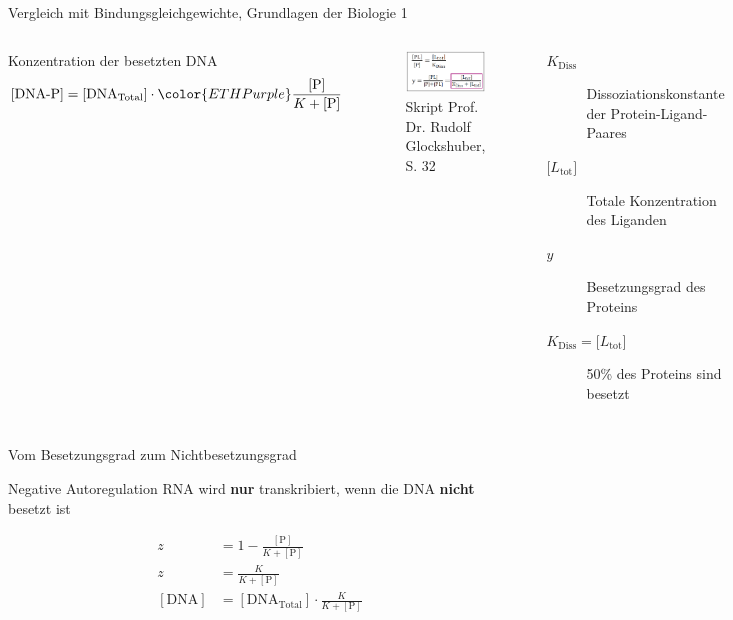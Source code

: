 \documentclass[11pt,aspectratio=169,reqno]{beamer}
\begin{document}
\begin{frame}{Vergleich mit Bindungsgleichgewichte, Grundlagen der Biologie 1}
    \begin{columns}
        Konzentration der besetzten DNA\vspace{1em}
        \[[\text{DNA-P}]=[\text{DNA$_\text{Total}$}]\cdot\color{ETHPurple}\frac{[\text{P}]}{K+[\text{P}]}\]
        \pause
        
        \begin{figure}
            \centering
            \includegraphics[width=.6\textwidth]{images/occuption_degree_glockshuber.png}
            \caption*{\tiny Skript Prof. Dr. Rudolf Glockshuber, S. 32}
        \end{figure}
        
        \begin{description}
            \item[$K_\text{Diss}$] Dissoziationskonstante der Protein-Ligand-Paares
            \item[$\lbrack L_\text{tot}\rbrack$] Totale Konzentration des Liganden
            \item[$y$] Besetzungsgrad des Proteins
            \item[$K_\text{Diss}=\lbrack L_\text{tot}\rbrack$] 50\% des Proteins sind besetzt
        \end{description}
    \end{columns}
\end{frame}

\begin{frame}{Vom Besetzungsgrad zum Nichtbesetzungsgrad}
\begin{block}{Negative Autoregulation}
    RNA wird \textbf{nur} transkribiert, wenn die DNA \textbf{nicht} besetzt ist
\end{block}

\begin{align*}
    z&=1-\frac{[\text{P}]}{K+[\text{P}]}\\[2em]
    z&=\frac{K}{K+[\text{P}]}\\[2em]
    [\text{DNA}]&=[\text{DNA}_\text{Total}]\cdot \frac{K}{K+[\text{P}]}
\end{align*}


\end{frame}
\end{document}
